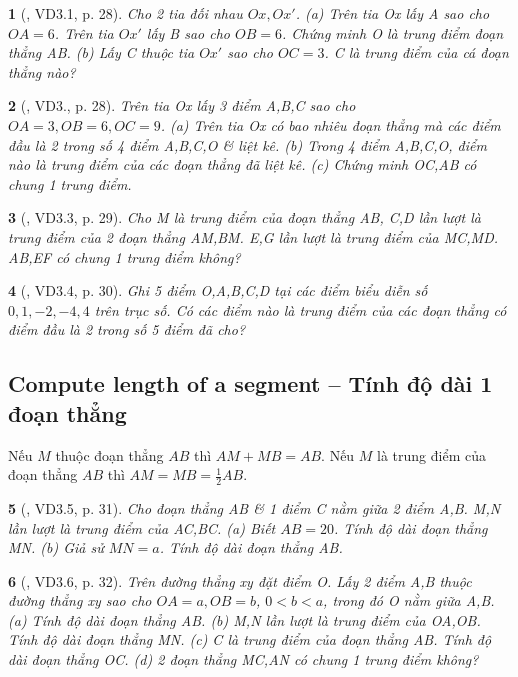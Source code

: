 \documentclass{article}
\newtheorem{baitoan}{}
\begin{document}
\begin{baitoan}[\cite{TLCT_THCS_Toan_6_hinh_hoc}, VD3.1, p. 28]
	Cho 2 tia đối nhau $Ox,Ox'$. (a) Trên tia Ox lấy A sao cho $OA = 6$. Trên tia $Ox'$ lấy B sao cho $OB = 6$. Chứng minh O là trung điểm đoạn thẳng AB. (b) Lấy C thuộc tia $Ox'$ sao cho $OC = 3$. C là trung điểm của cá đoạn thẳng nào?
\end{baitoan}

\begin{baitoan}[\cite{TLCT_THCS_Toan_6_hinh_hoc}, VD3., p. 28]
	Trên tia Ox lấy 3 điểm A,B,C sao cho $OA = 3,OB = 6,OC = 9$. (a) Trên tia Ox có bao nhiêu đoạn thẳng mà các điểm đầu là 2 trong số 4 điểm A,B,C,O \& liệt kê. (b) Trong 4 điểm A,B,C,O, điểm nào là trung điểm của các đoạn thẳng đã liệt kê. (c) Chứng minh OC,AB có chung 1 trung điểm.
\end{baitoan}

\begin{baitoan}[\cite{TLCT_THCS_Toan_6_hinh_hoc}, VD3.3, p. 29]
	Cho M là trung điểm của đoạn thẳng AB, C,D lần lượt là trung điểm của 2 đoạn thẳng AM,BM. E,G lần lượt là trung điểm của MC,MD. AB,EF có chung 1 trung điểm không?
\end{baitoan}

\begin{baitoan}[\cite{TLCT_THCS_Toan_6_hinh_hoc}, VD3.4, p. 30]
	Ghi 5 điểm O,A,B,C,D tại các điểm biểu diễn số $0,1,-2,-4,4$ trên trục số. Có các điểm nào là trung điểm của các đoạn thẳng có điểm đầu là 2 trong số 5 điểm đã cho?
\end{baitoan}


\subsection{Compute length of a segment -- Tính độ dài 1 đoạn thẳng}
 Nếu $M$ thuộc đoạn thẳng $AB$ thì $AM + MB = AB$.  Nếu $M$ là trung điểm của đoạn thẳng $AB$ thì $AM = MB = \frac{1}{2}AB$.

\begin{baitoan}[\cite{TLCT_THCS_Toan_6_hinh_hoc}, VD3.5, p. 31]
	Cho đoạn thẳng AB \& 1 điểm C nằm giữa 2 điểm A,B. M,N lần lượt là trung điểm của AC,BC. (a) Biết $AB = 20$. Tính độ dài đoạn thẳng MN. (b) Giả sử $MN = a$. Tính độ dài đoạn thẳng AB.
\end{baitoan}

\begin{baitoan}[\cite{TLCT_THCS_Toan_6_hinh_hoc}, VD3.6, p. 32]
	Trên đường thẳng xy đặt điểm O. Lấy 2 điểm A,B thuộc đường thẳng xy sao cho $OA = a,OB = b$, $0 < b < a$, trong đó O nằm giữa A,B. (a) Tính độ dài đoạn thẳng AB. (b) M,N lần lượt là trung điểm của OA,OB. Tính độ dài đoạn thẳng MN. (c) C là trung điểm của đoạn thẳng AB. Tính độ dài đoạn thẳng OC. (d) 2 đoạn thẳng MC,AN có chung 1 trung điểm không?
\end{baitoan}
\end{document}
